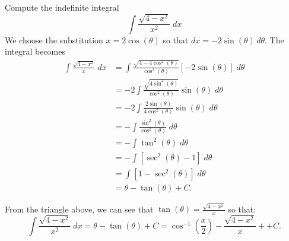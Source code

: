 \documentclass{ximera}
\begin{document}
\begin{example}[example 2]
Compute the indefinite integral
\[
\int \frac{\sqrt{4-x^2}}{x^2} \; dx
\]
We choose the substitution $x = 2\cos(\theta)$ so that $dx = -2\sin(\theta) \, d\theta$.
The integral becomes
\begin{align*}
\int \frac{\sqrt{4-x^2}}{x} \; dx &= \int \frac{\sqrt{4-4\cos^2(\theta)}}{\cos^2(\theta)} \left[-2\sin(\theta)\right] \; d\theta\\[6pt]
                                  &= -2\int \frac{\sqrt{4\sin^2(\theta)}}{\cos^2(\theta)}  \sin(\theta) \; d\theta\\[6pt]
                                  &= -2\int \frac{2\sin(\theta)}{4\cos^2(\theta)}  \sin(\theta) \; d\theta\\[6pt]
 &= -\int \frac{\sin^2(\theta)}{\cos^2(\theta)}  \; d\theta\\[6pt]
 &= -\int \tan^2(\theta)  \; d\theta\\[6pt]
&= -\int \left[\sec^2(\theta) - 1\right] \; d\theta\\[6pt]
&= \int \left[1 - \sec^2(\theta)\right] \; d\theta\\[6pt]
&= \theta-\tan(\theta)  + C.
\end{align*}



\begin{image}
\end{image}




From the triangle above, we can see that $\tan(\theta) = \frac{\sqrt{4-x^2}}{x}$ so that:
\[
\int \frac{\sqrt{4-x^2}}{x^2} \; dx = \theta -\tan(\theta) + C = \cos^{-1}\left(\frac{x}{2}\right) -\frac{\sqrt{4-x^2}}{x} +  + C. 
\]

\end{example}
\end{document}
